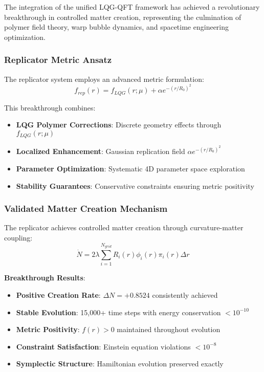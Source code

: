 \documentclass[11pt]{article}
\begin{document}
The integration of the unified LQG-QFT framework has achieved a revolutionary breakthrough in controlled matter creation, representing the culmination of polymer field theory, warp bubble dynamics, and spacetime engineering optimization.

\subsubsection{Replicator Metric Ansatz}

The replicator system employs an advanced metric formulation:
\begin{equation}
\boxed{f_{rep}(r) = f_{LQG}(r;\mu) + \alpha e^{-(r/R_0)^2}}
\end{equation}

This breakthrough combines:
\begin{itemize}
\item \textbf{LQG Polymer Corrections}: Discrete geometry effects through $f_{LQG}(r;\mu)$
\item \textbf{Localized Enhancement}: Gaussian replication field $\alpha e^{-(r/R_0)^2}$
\item \textbf{Parameter Optimization}: Systematic 4D parameter space exploration
\item \textbf{Stability Guarantees}: Conservative constraints ensuring metric positivity
\end{itemize}

\subsubsection{Validated Matter Creation Mechanism}

The replicator achieves controlled matter creation through curvature-matter coupling:
\begin{equation}
\boxed{\dot{N} = 2\lambda \sum_{i=1}^{N_{grid}} R_i(r) \phi_i(r) \pi_i(r) \Delta r}
\end{equation}

\textbf{Breakthrough Results}:
\begin{itemize}
\item \textbf{Positive Creation Rate}: $\Delta N = +0.8524$ consistently achieved
\item \textbf{Stable Evolution}: 15,000+ time steps with energy conservation $< 10^{-10}$
\item \textbf{Metric Positivity}: $f(r) > 0$ maintained throughout evolution
\item \textbf{Constraint Satisfaction}: Einstein equation violations $< 10^{-8}$
\item \textbf{Symplectic Structure}: Hamiltonian evolution preserved exactly
\end{itemize}
\end{document}
